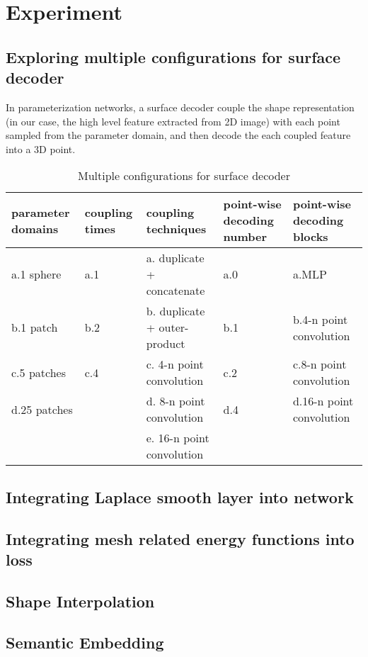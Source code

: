 \section{Experiment}
\subsection{Exploring multiple configurations for surface decoder}
In parameterization networks, a surface decoder couple the shape representation (in our case, the high level feature extracted from 2D image) with each point sampled from the parameter domain, and then decode the each coupled feature into a 3D point. 
\begin{table*}
	\caption{Multiple configurations for surface decoder}
	\label{tab:mulconfig}
	\centering
	\begin{tabular}{l | l | l | l | l}
		parameter domains & coupling times &coupling techniques & point-wise decoding number & point-wise decoding blocks\\
		\hline
		a.1 sphere	 & a.1 & a. duplicate + concatenate 	& a.0	& a.MLP \\
		b.1 patch    & b.2 & b. duplicate + outer-product   & b.1   & b.4-n point convolution \\
		c.5 patches	 & c.4 & c. 4-n point convolution       & c.2   & c.8-n point convolution \\
		d.25 patches &  ~  & d. 8-n point convolution       & d.4   & d.16-n point convolution  \\
		~            &  ~  & e. 16-n point convolution              &  ~						 
	\end{tabular}
\end{table*}
\subsection{Integrating Laplace smooth layer into network}

\subsection{Integrating mesh related energy functions into loss}

\subsection{Shape Interpolation}

\subsection{Semantic Embedding}
